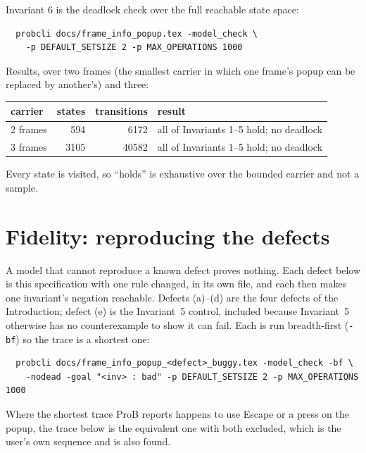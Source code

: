 \documentclass[a4paper,10pt,fleqn]{article}
\begin{document}
Invariant 6 is the deadlock check over the full reachable state space:
\begin{verbatim}
  probcli docs/frame_info_popup.tex -model_check \
    -p DEFAULT_SETSIZE 2 -p MAX_OPERATIONS 1000
\end{verbatim}

Results, over two frames (the smallest carrier in which one frame's popup can
be replaced by another's) and three:
\begin{center}
\begin{tabular}{lrrl}
  carrier & states & transitions & result \\ \hline
  2 frames & 594 & 6172 & all of Invariants 1--5 hold; no deadlock \\
  3 frames & 3105 & 40582 & all of Invariants 1--5 hold; no deadlock \\
\end{tabular}
\end{center}
Every state is visited, so ``holds'' is exhaustive over the bounded carrier and
not a sample.

\section{Fidelity: reproducing the defects}
\label{sec:fidelity}

A model that cannot reproduce a known defect proves nothing.  Each defect below
is this specification with one rule changed, in its own file, and each then
makes one invariant's negation reachable.  Defects (a)--(d) are the four defects
of the Introduction; defect (e) is the Invariant~5 control, included because
Invariant~5 otherwise has no counterexample to show it can fail.  Each is run
breadth-first (\texttt{-bf}) so the trace is a shortest one:
\begin{verbatim}
  probcli docs/frame_info_popup_<defect>_buggy.tex -model_check -bf \
    -nodead -goal "<inv> : bad" -p DEFAULT_SETSIZE 2 -p MAX_OPERATIONS 1000
\end{verbatim}
Where the shortest trace ProB reports happens to use Escape or a press on the
popup, the trace below is the equivalent one with both excluded, which is the
user's own sequence and is also found.
\end{document}
